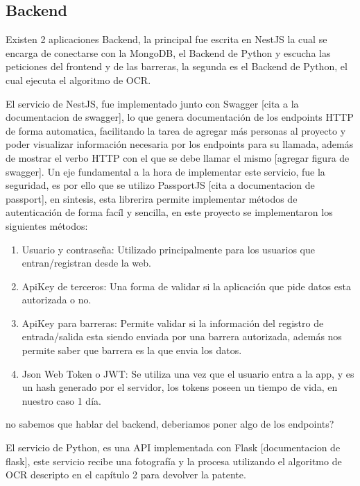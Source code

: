 \subsection{Backend}

Existen 2 aplicaciones Backend, la principal fue escrita en NestJS \cite{noauthor_documentacion_nodate} la cual se encarga de conectarse con la MongoDB, el Backend de Python y escucha las peticiones del frontend y de las barreras, la segunda es el Backend de Python, el cual ejecuta el algoritmo de OCR.

El servicio de NestJS, fue implementado junto con Swagger [cita  a la documentacion de swagger], lo que genera documentación de los endpoints HTTP de forma automatica, facilitando la tarea de agregar más personas al proyecto y poder visualizar información necesaria por los endpoints para su llamada, además de mostrar el verbo HTTP con el que se debe llamar el mismo [agregar figura de swagger]. Un eje fundamental a la hora de implementar este servicio, fue la seguridad, es por ello que se utilizo PassportJS [cita a documentacion de passport], en sintesis, esta librerira permite implementar métodos de autenticación de forma facíl y sencilla, en este proyecto se implementaron los siguientes métodos:

\begin{enumerate}
    \item Usuario y contraseña: Utilizado principalmente para los usuarios que entran/registran desde la web.
    \item ApiKey de terceros: Una forma de validar si la aplicación que pide datos esta autorizada o no.
    \item ApiKey para barreras: Permite validar si la información del registro de entrada/salida esta siendo enviada por una barrera autorizada, además nos permite saber que barrera es la que envia los datos.
    \item Json Web Token o JWT: Se utiliza una vez que el usuario entra a la app, y es un hash generado por el servidor, los tokens poseen un tiempo de vida, en nuestro caso 1 día.
\end{enumerate}

{\huge no sabemos que hablar del backend, deberiamos poner algo de los endpoints?}

El servicio de Python, es una API implementada con Flask [documentacion de flask], este servicio recibe una fotografía y la procesa utilizando el algoritmo de OCR descripto en el capítulo 2 para devolver la patente.

